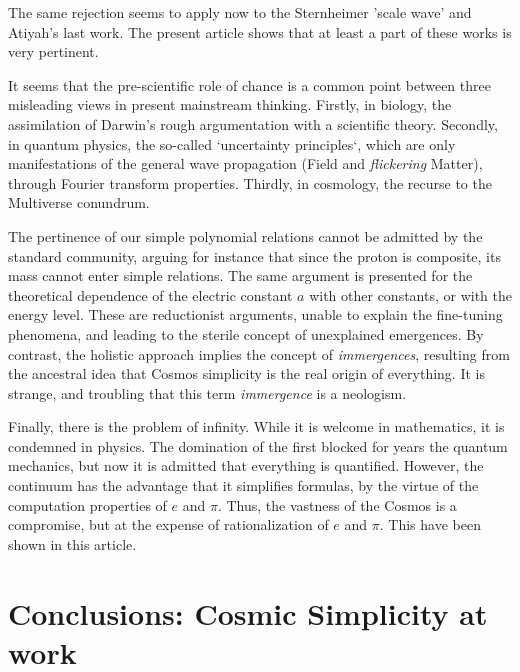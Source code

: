 \documentclass[twoside,draft]{article}
\begin{document}
\begin{sloppypar}
The same rejection seems to apply now to the Sternheimer 'scale wave' and Atiyah's last work. The present article shows that at least a part of these works is very pertinent.

It seems that the pre-scientific role of chance is a common point between three misleading views
in present mainstream thinking. Firstly, in biology, the assimilation of Darwin's rough argumentation
with a scientific theory. Secondly, in quantum physics, the so-called `uncertainty principles`, which are
only manifestations of the general wave propagation (Field and \textit{flickering} Matter), through Fourier
transform properties. Thirdly, in cosmology, the recurse to the Multiverse conundrum.

The pertinence of our simple polynomial relations cannot be admitted by the standard community, arguing for instance that since the proton is composite, its mass cannot enter simple relations. The same argument is presented for the theoretical dependence of the electric constant $a$ with other constants, or with the energy level. These are reductionist arguments, unable to explain the fine-tuning phenomena, and leading to the sterile concept of unexplained emergences. By contrast, the holistic approach implies the concept of \textit{immergences}, resulting from the ancestral idea that Cosmos simplicity is the real origin of everything. It is strange, and troubling that this term \textit{immergence} is a neologism.

Finally, there is the problem of infinity. While it is welcome in mathematics, it is condemned in physics. The domination of the first blocked for years the quantum mechanics, but now it is admitted that everything is quantified. However, the continuum has the advantage that it simplifies formulas, by the virtue of the computation properties of $e$ and $\pi$. Thus, the vastness of the Cosmos is a compromise, but at the expense of rationalization of $e$ and $\pi$. This have been shown in this article.

\section {Conclusions: Cosmic Simplicity at work}


\end{sloppypar}
\end{document}
